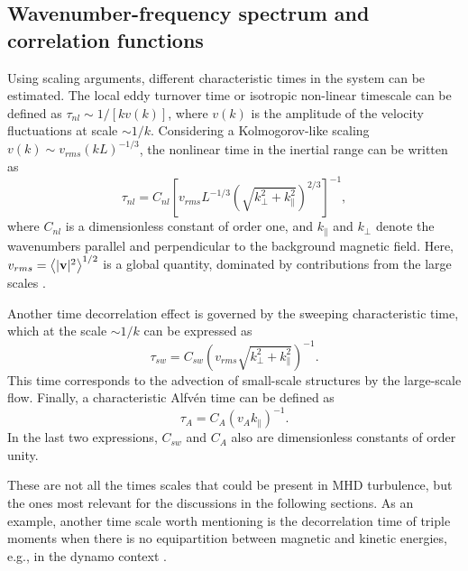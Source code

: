 \documentclass[aip,pop,reprint,amsmath,amssymb,floatfix]{revtex4-1}
\begin{document}
\subsection{Wavenumber-frequency spectrum and correlation functions}\label{sec_Wfspectrum_and_Gamma}

Using scaling arguments, different characteristic times in the system
can be estimated. The local eddy turnover time or isotropic non-linear
timescale can be defined as $\tau_{nl} \sim 1/\left[ k v(k) \right]$,
where $v(k)$ is the amplitude of the velocity fluctuations at scale
$\sim 1/k$. Considering a Kolmogorov-like scaling
$v(k) \sim v_{rms} \left(kL\right)^{-1/3}$, the nonlinear time in the
inertial range can be written as
\begin{equation}
\tau_{nl} = C_{nl} \left [
   v_{rms} L^{-1/3} \left(\sqrt{k^2_\perp +
   k^2_\parallel}\right)^{2/3}\right ]^{-1},
\label{eq:taunl}
\end{equation}
where $C_{nl}$ is a dimensionless constant of order one, and
$k_\parallel$ and $k_\perp$ denote the wavenumbers parallel and
perpendicular to the background magnetic field. Here,
$v_{rms} = \left\langle |{\bf v}|^2 \right\rangle ^{1/2}$ is a global
quantity, dominated by contributions from the large scales
\cite{zhou_magnetohydrodynamic_2004, matthaeus_anisotropic_2009}.

Another time decorrelation effect is governed by the sweeping
characteristic time, which at the scale $\sim 1/k$ can be expressed as
\begin{equation}
\tau_{sw} = C_{sw} \left( v_{rms}\sqrt{k^2_\perp + k^2_\parallel}
    \right)^{-1} .
\label{eq:tausw}
\end{equation}
This time corresponds to the advection of small-scale structures by
the large-scale flow. Finally, a characteristic Alfv\'en time can be
defined as
\begin{equation}
\tau_A= C_A \left( v_A k_\parallel \right)^{-1} .
\label{eq:taua}
\end{equation}
In the last two expressions, $C_{sw}$ and $C_A$ also are dimensionless
constants of order unity.

These are not all the times scales that could be present in MHD turbulence, 
but the ones most relevant for the discussions in the following sections. 
As an example, another time scale worth mentioning is the decorrelation 
time of triple moments when there is no equipartition between magnetic 
and kinetic energies, e.g., in the dynamo context 
\cite{baerenzung_2008_spectral}.
\end{document}
